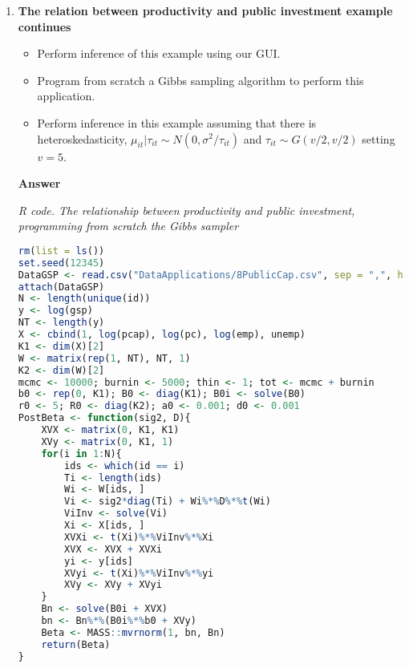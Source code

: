 \begin{enumerate}[leftmargin=*]
	\item \textbf{The relation between productivity and public investment example continues}

\begin{itemize}
	\item Perform inference of this example using our GUI.
	\item Program from scratch a Gibbs sampling algorithm to perform this application.
	\item Perform inference in this example assuming that there is heteroskedasticity, $\mu_{it}|\tau_{it}\sim N(0, \sigma^2/\tau_{it})$ and $\tau_{it}\sim G(v/2,v/2)$ setting $v=5$. 
\end{itemize}

\textbf{Answer}
\begin{tcolorbox}[enhanced,width=4.67in,center upper,
	fontupper=\large\bfseries,drop shadow southwest,sharp corners]
	\textit{R code. The relationship between productivity and public investment, programming from scratch the Gibbs sampler}
	\begin{VF}
		\begin{lstlisting}[language=R]
rm(list = ls())
set.seed(12345)
DataGSP <- read.csv("DataApplications/8PublicCap.csv", sep = ",", header = TRUE, fileEncoding = "latin1")
attach(DataGSP)
N <- length(unique(id))
y <- log(gsp)
NT <- length(y)
X <- cbind(1, log(pcap), log(pc), log(emp), unemp)
K1 <- dim(X)[2]
W <- matrix(rep(1, NT), NT, 1)
K2 <- dim(W)[2]
mcmc <- 10000; burnin <- 5000; thin <- 1; tot <- mcmc + burnin
b0 <- rep(0, K1); B0 <- diag(K1); B0i <- solve(B0) 
r0 <- 5; R0 <- diag(K2); a0 <- 0.001; d0 <- 0.001
PostBeta <- function(sig2, D){
	XVX <- matrix(0, K1, K1)
	XVy <- matrix(0, K1, 1)
	for(i in 1:N){
		ids <- which(id == i)
		Ti <- length(ids)
		Wi <- W[ids, ]
		Vi <- sig2*diag(Ti) + Wi%*%D%*%t(Wi)
		ViInv <- solve(Vi)
		Xi <- X[ids, ]
		XVXi <- t(Xi)%*%ViInv%*%Xi
		XVX <- XVX + XVXi
		yi <- y[ids]
		XVyi <- t(Xi)%*%ViInv%*%yi
		XVy <- XVy + XVyi
	}
	Bn <- solve(B0i + XVX)
	bn <- Bn%*%(B0i%*%b0 + XVy)
	Beta <- MASS::mvrnorm(1, bn, Bn)
	return(Beta)
}
\end{lstlisting}
	\end{VF}
\end{tcolorbox}



\end{enumerate}

